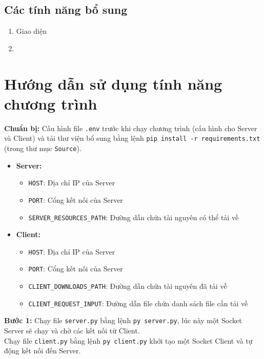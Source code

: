 \documentclass[a4paper,12pt]{report}
\begin{document}
    \subsection{Các tính năng bổ sung}
    \begin{enumerate}
        \item Giao diện
        \item 
    \end{enumerate}

\pagebreak
\section{Hướng dẫn sử dụng tính năng chương trình}
\begin{description}
  \item \textbf{Chuẩn bị:} Cấu hình file \verb|.env| trước khi chạy chương trình (cấu hình cho Server và Client) và tải thư viện bổ sung bằng lệnh \verb|pip install -r requirements.txt| (trong thư mục \verb|Source|).
        \begin{itemize}
          \item \textbf{Server:}
                \begin{itemize}
                  \item \verb|HOST|: Địa chỉ IP của Server
                  \item \verb|PORT|: Cổng kết nối của Server
                  \item \verb|SERVER_RESOURCES_PATH|: Đường dẫn chứa tài nguyên có thể tải về
                \end{itemize}
          \item \textbf{Client:}
                \begin{itemize}
                  \item \verb|HOST|: Địa chỉ IP của Server
                  \item \verb|PORT|: Cổng kết nối của Server
                  \item \verb|CLIENT_DOWNLOADS_PATH|: Đường dẫn chứa tài nguyên đã tải về
                  \item \verb|CLIENT_REQUEST_INPUT|: Đường dẫn file chứa danh sách file cần tải về
                \end{itemize}
        \end{itemize}
  \item \textbf{Bước 1:} Chạy file \verb|server.py| bằng lệnh \verb|py server.py|, lúc này một Socket Server sẽ chạy và chờ các kết nối từ Client.\\Chạy file \verb|client.py| bằng lệnh \verb|py client.py| khởi tạo một Socket Client và tự động kết nối đến Server.

\end{description}
\end{document}
